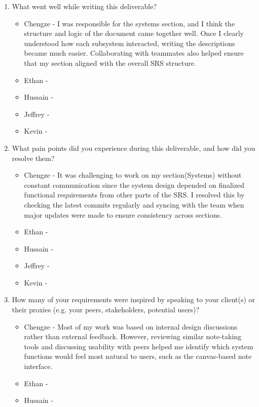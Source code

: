 \begin{enumerate}
  \item What went well while writing this deliverable?
  \begin{itemize}
        \item Chengze - I was responsible for the systems section, and 
        I think the structure and logic of the document came together 
        well. Once I clearly understood how each subsystem interacted, 
        writing the descriptions became much easier. Collaborating with 
        teammates also helped ensure that my section aligned with the 
        overall SRS structure.
        \item Ethan - 
        \item Hussain - 
        \item Jeffrey - 
        \item Kevin - 
  \end{itemize} 
  \item What pain points did you experience during this deliverable, and how did
  you resolve them?
  \begin{itemize}
        \item Chengze - It was challenging to work on my section(Systems) without 
        constant communication since the system design depended on finalized 
        functional requirements from other parts of the SRS. I resolved this 
        by checking the latest commits regularly and syncing with the team when 
        major updates were made to ensure consistency across sections.
        \item Ethan - 
        \item Hussain - 
        \item Jeffrey - 
        \item Kevin - 
  \end{itemize} 
  \item How many of your requirements were inspired by speaking to your
  client(s) or their proxies (e.g. your peers, stakeholders, potential users)?
  \begin{itemize}
        \item Chengze - Most of my work was based on internal design discussions 
        rather than external feedback. However, reviewing similar note-taking tools 
        and discussing usability with peers helped me identify which system functions 
        would feel most natural to users, such as the canvas-based note interface.
        \item Ethan - 
        \item Hussain - 

\end{itemize}
\end{enumerate}
